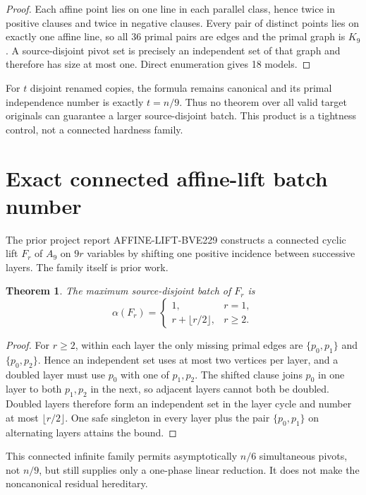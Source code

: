 \documentclass[11pt]{article}
\newtheorem{theorem}{Theorem}
\begin{document}
\begin{proof}
Each affine point lies on one line in each parallel class, hence twice in
positive clauses and twice in negative clauses.  Every pair of distinct points
lies on exactly one affine line, so all 36 primal pairs are edges and the
primal graph is $K_9$.  A source-disjoint pivot set is precisely an independent
set of that graph and therefore has size at most one.  Direct enumeration gives
18 models.
\end{proof}

For $t$ disjoint renamed copies, the formula remains canonical and its primal
independence number is exactly $t=n/9$.  Thus no theorem over all valid target
originals can guarantee a larger source-disjoint batch.  This product is a
tightness control, not a connected hardness family.

\section{Exact connected affine-lift batch number}

The prior project report AFFINE-LIFT-BVE229 constructs a connected cyclic lift
$F_r$ of $A_9$ on $9r$ variables by shifting one positive incidence between
successive layers.  The family itself is prior work.

\begin{theorem}
The maximum source-disjoint batch of $F_r$ is
\[
 \alpha(F_r)=
 \begin{cases}1,&r=1,\\r+\lfloor r/2\rfloor,&r\ge2.\end{cases}
\]
\end{theorem}

\begin{proof}
For $r\ge2$, within each layer the only missing primal edges are
$\{p_0,p_1\}$ and $\{p_0,p_2\}$.  Hence an independent set uses at most two
vertices per layer, and a doubled layer must use $p_0$ with one of
$p_1,p_2$.  The shifted clause joins $p_0$ in one layer to both $p_1,p_2$ in
the next, so adjacent layers cannot both be doubled.  Doubled layers therefore
form an independent set in the layer cycle and number at most
$\lfloor r/2\rfloor$.  One safe singleton in every layer plus the pair
$\{p_0,p_1\}$ on alternating layers attains the bound.
\end{proof}

This connected infinite family permits asymptotically $n/6$ simultaneous
pivots, not $n/9$, but still supplies only a one-phase linear reduction.  It
does not make the noncanonical residual hereditary.
\end{document}
